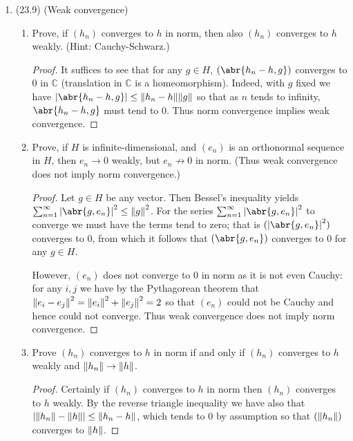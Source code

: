 \documentclass[11pt]{article}
\DeclareMathOperator{\im}{im}
\begin{document}
\begin{enumerate}
\begin{enumerate}
\begin{proof}
        We have that $(\ker T^\ast)^\perp = ((\im T)^\perp)^\perp$, which is the smallest closed subspace of $H$ containing $\im T$; that is, $\overline{\im T}$. 
      \end{proof} 
    \end{enumerate}
    \item (23.9) (Weak convergence) \begin{enumerate}
      \item Prove, if $(h_n)$ converges to $h$ in norm, then also $(h_n)$ converges to $h$ weakly. (Hint: Cauchy-Schwarz.) \begin{proof}
        It suffices to see that for any $g\in H$, $(\abr{h_n-h,g})$ converges to $0$ in $\mathbb{C}$ (translation in $\mathbb{C}$ is a homeomorphism). Indeed, with $g$ fixed we have $\abs{\abr{h_n-h,g}}\leq \norm{h_n-h}\norm{g}$ so that as $n$ tends to infinity, $\abr{h_n-h,g}$ must tend to $0$. Thus norm convergence implies weak convergence.
      \end{proof}
      \item Prove, if $H$ is infinite-dimensional, and $(e_n)$ is an orthonormal sequence in $H$, then $e_n\to 0$ weakly, but $e_n\not\to 0$ in norm. (Thus weak convergence does not imply norm convergence.) \begin{proof}
        Let $g\in H$ be any vector. Then Bessel's inequality yields $\sum_{n=1}^\infty\abs{\abr{g,e_n}}^2\leq \norm{g}^2$. For the series $\sum_{n=1}^\infty\abs{\abr{g,e_n}}^2$ to converge we must have the terms tend to zero; that is $(\abs{\abr{g,e_n}}^2)$ converges to $0$, from which it follows that $(\abr{g,e_n})$ converges to $0$ for any $g\in H$.

        However, $(e_n)$ does not converge to $0$ in norm as it is not even Cauchy: for any $i,j$ we have by the Pythagorean theorem that $\norm{e_i-e_j}^2 = \norm{e_i}^2 + \norm{e_j}^2 = 2$ so that $(e_n)$ could not be Cauchy and hence could not converge. Thus weak convergence does not imply norm convergence. 
      \end{proof}
      \item Prove $(h_n)$ converges to $h$ in norm if and only if $(h_n)$ converges to $h$ weakly and $\norm{h_n}\to \norm{h}$. \begin{proof}
        Certainly if $(h_n)$ converges to $h$ in norm then $(h_n)$ converges to $h$ weakly. By the reverse triangle inequality we have also that $\abs{\norm{h_n}-\norm{h}}\leq \norm{h_n-h}$, which tends to $0$ by assumption so that $(\norm{h_n})$ converges to $\norm{h}$.


\end{proof}
\end{enumerate}
\end{enumerate}
\end{document}
